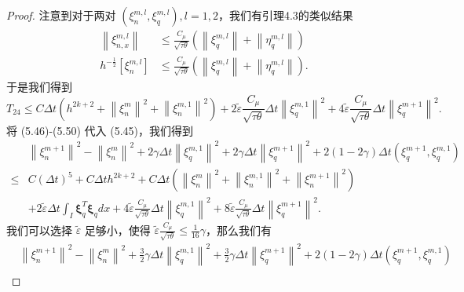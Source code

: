 \begin{proof}
    注意到对于两对 $\left(\xi_{n}^{m, l}, \xi_{q}^{m, l}\right), l=1,2$，我们有引理4.3的类似结果
    \begin{align}
        \left\|\xi_{n, x}^{m, l}\right\|            & \leq \frac{C_{\mu}}{\sqrt{\tau \theta}}\left(\left\|\xi_{q}^{m, l}\right\|+\left\|\eta_{q}^{m, l}\right\|\right) \nonumber \\
        h^{-\frac{1}{2}}\left[\xi_{n}^{m, l}\right] & \leq \frac{C_{\mu}}{\sqrt{\tau \theta}}\left(\left\|\xi_{q}^{m, l}\right\|+\left\|\eta_{q}^{m, l}\right\|\right).
    \end{align}
    于是我们得到
    \begin{equation}
        T_{24} \leq C \Delta t\left(h^{2 k+2}+\left\|\xi_{n}^{m}\right\|^{2}+\left\|\xi_{n}^{m, 1}\right\|^{2}\right)+2 \tilde{\varepsilon} \frac{C_{\mu}}{\sqrt{\tau \theta}} \Delta t\left\|\xi_{q}^{m, 1}\right\|^{2}+4 \tilde{\varepsilon} \frac{C_{\mu}}{\sqrt{\tau \theta}} \Delta t\left\|\xi_{q}^{m+1}\right\|^{2}.
    \end{equation}
    将 (5.46)-(5.50) 代入 (5.45)，我们得到
    \begin{equation}
        \begin{split}
            & \left\|\xi_{n}^{m+1}\right\|^{2}-\left\|\xi_{n}^{m}\right\|^{2}+2 \gamma \Delta t\left\|\xi_{q}^{m, 1}\right\|^{2}+2 \gamma \Delta t\left\|\xi_{q}^{m+1}\right\|^{2}+2(1-2 \gamma) \Delta t\left(\xi_{q}^{m+1}, \xi_{q}^{m, 1}\right) \\
            \leq & C(\Delta t)^{5}+C \Delta t h^{2 k+2}+C \Delta t\left(\left\|\xi_{n}^{m}\right\|^{2}+\left\|\xi_{n}^{m, 1}\right\|^{2}+\left\|\xi_{n}^{m+1}\right\|^{2}\right) \\
            & +2 \tilde{\varepsilon} \Delta t \int_{I} \boldsymbol{\xi}_{q}^{T} \boldsymbol{\xi}_{q} d x+4 \tilde{\varepsilon} \frac{C_{\mu}}{\sqrt{\tau \theta}} \Delta t\left\|\xi_{q}^{m, 1}\right\|^{2}+8 \tilde{\varepsilon} \frac{C_{\mu}}{\sqrt{\tau \theta}} \Delta t\left\|\xi_{q}^{m+1}\right\|^{2} .
        \end{split}
    \end{equation}
    我们可以选择 $\tilde{\varepsilon}$ 足够小，使得 $\tilde{\varepsilon} \frac{C_{\mu}}{\sqrt{\tau \theta}} \leq \frac{1}{16} \gamma$，那么我们有
    \begin{equation}
        \begin{aligned}
                 & \left\|\xi_{n}^{m+1}\right\|^{2}-\left\|\xi_{n}^{m}\right\|^{2}+\frac{3}{2} \gamma \Delta t\left\|\xi_{q}^{m, 1}\right\|^{2}+\frac{3}{2} \gamma \Delta t\left\|\xi_{q}^{m+1}\right\|^{2}+2(1-2 \gamma) \Delta t\left(\xi_{q}^{m+1}, \xi_{q}^{m, 1}\right) \\

\end{aligned}
\end{equation}
\end{proof}
